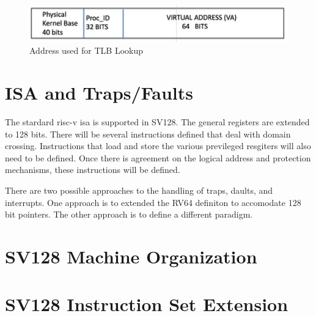 \documentclass{article}
\begin{document}
\begin{figure}
\includegraphics [scale = .7]
{figures/figure12_address_tlb_lookup.jpg}
\caption{Address used for TLB Lookup}
\end{figure}

\section{ISA and Traps/Faults}

The stardard risc-v isa is supported in SV128.  The  general registers are extended to 128 bits. There will be several instructions defined that deal with domain crossing.  Instructions that load and store the various previleged resgiters will also  need to be defined.  Once there is agreement on the logical address and  protection mechanisms,  these instructions will be defined.

There are two possible approaches to the handling of traps, daults,  and interrupts.  One approach is to extended the RV64 definiton to  accomodate 128 bit pointers.  The other approach is to define a  different paradigm.











\clearpage
\section{SV128 Machine Organization}
\label{sec:SV128MachineOrganization}

\clearpage
\section{SV128 Instruction Set Extension}
\label{sec:SV128InstructionSetExtension}
\end{document}
